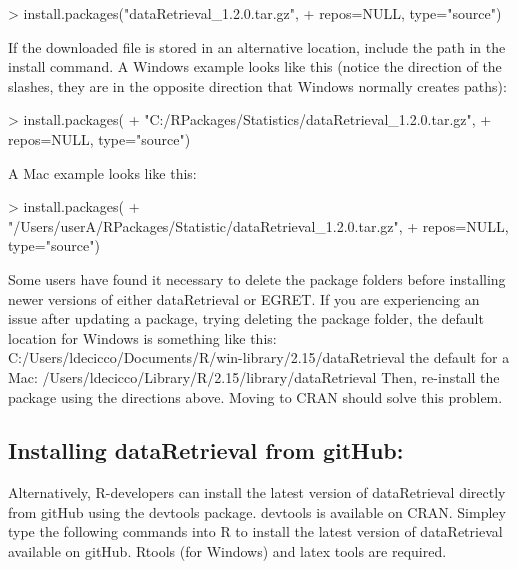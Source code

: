 \documentclass[a4paper,11pt]{article}
\begin{document}
\begin{Schunk}
\begin{Sinput}
> install.packages("dataRetrieval_1.2.0.tar.gz", 
+                  repos=NULL, type="source")
\end{Sinput}
\end{Schunk}

If the downloaded file is stored in an alternative location, include the path in the install command.  A Windows example looks like this (notice the direction of the slashes, they are in the opposite direction that Windows normally creates paths):

\begin{Schunk}
\begin{Sinput}
> install.packages(
+   "C:/RPackages/Statistics/dataRetrieval_1.2.0.tar.gz", 
+   repos=NULL, type="source")
\end{Sinput}
\end{Schunk}

A Mac example looks like this:

\begin{Schunk}
\begin{Sinput}
> install.packages(
+   "/Users/userA/RPackages/Statistic/dataRetrieval_1.2.0.tar.gz", 
+   repos=NULL, type="source")
\end{Sinput}
\end{Schunk}

Some users have found it necessary to delete the package folders before installing newer versions of either dataRetrieval or EGRET. If you are experiencing an issue after updating a package, trying deleting the package folder, the default location for Windows is something like this: C:/Users/ldecicco/Documents/R/win-library/2.15/dataRetrieval the default for a Mac: /Users/ldecicco/Library/R/2.15/library/dataRetrieval Then, re-install the package using the directions above. Moving to CRAN should solve this problem.


\subsection{Installing dataRetrieval from gitHub:}
Alternatively, R-developers can install the latest version of dataRetrieval directly from gitHub using the devtools package.  devtools is available on CRAN.  Simpley type the following commands into R to install the latest version of dataRetrieval available on gitHub.  Rtools (for Windows) and latex tools are required.
\end{document}
